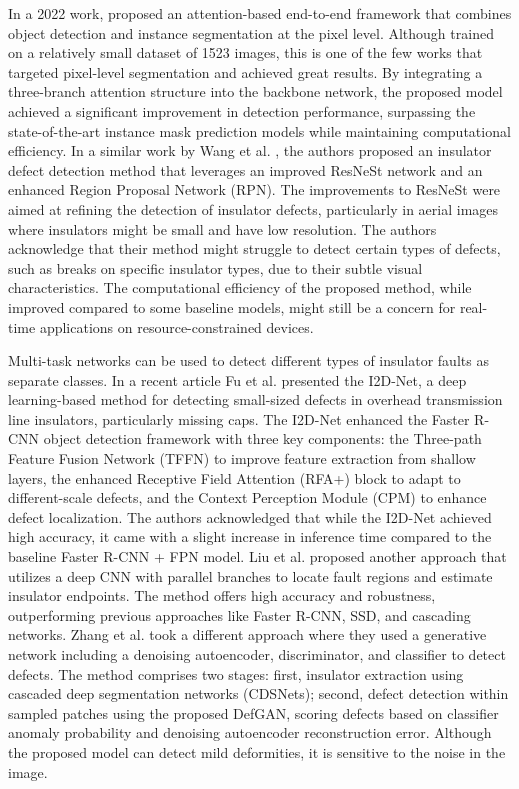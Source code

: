 In a 2022 work, \cite{antwi_bekoe_deep_2022} proposed an attention-based end-to-end framework that combines object detection and instance segmentation at the pixel level. Although trained on a relatively small dataset of 1523 images, this is one of the few works that targeted pixel-level segmentation and achieved great results. By integrating a three-branch attention structure into the backbone network, the proposed model achieved a significant improvement in detection performance, surpassing the state-of-the-art instance mask prediction models while maintaining computational efficiency. In a similar work by Wang et al. \cite{wang_detection_2020}, the authors proposed an insulator defect detection method that leverages an improved ResNeSt network and an enhanced Region Proposal Network (RPN). The improvements to ResNeSt were aimed at refining the detection of insulator defects, particularly in aerial images where insulators might be small and have low resolution. The authors acknowledge that their method might struggle to detect certain types of defects, such as breaks on specific insulator types, due to their subtle visual characteristics. The computational efficiency of the proposed method, while improved compared to some baseline models, might still be a concern for real-time applications on resource-constrained devices.

Multi-task networks can be used to detect different types of insulator faults as separate classes. In a recent article Fu et al. \cite{fu_small_sized_2023} presented the I2D-Net, a deep learning-based method for detecting small-sized defects in overhead transmission line insulators, particularly missing caps. The I2D-Net enhanced the Faster R-CNN object detection framework with three key components: the Three-path Feature Fusion Network (TFFN) to improve feature extraction from shallow layers, the enhanced Receptive Field Attention (RFA+) block to adapt to different-scale defects, and the Context Perception Module (CPM) to enhance defect localization. The authors acknowledged that while the I2D-Net achieved high accuracy, it came with a slight increase in inference time compared to the baseline Faster R-CNN + FPN model. Liu et al. \cite{liu_box_point_2021} proposed another approach that utilizes a deep CNN with parallel branches to locate fault regions and estimate insulator endpoints. The method offers high accuracy and robustness, outperforming previous approaches like Faster R-CNN, SSD, and cascading networks. Zhang et al. \cite{zhang_defgan_2021} took a different approach where they used a generative network including a denoising autoencoder, discriminator, and classifier to detect defects. The method comprises two stages: first, insulator extraction using cascaded deep segmentation networks (CDSNets); second, defect detection within sampled patches using the proposed DefGAN, scoring defects based on classifier anomaly probability and denoising autoencoder reconstruction error. Although the proposed model can detect mild deformities, it is sensitive to the noise in the image.

